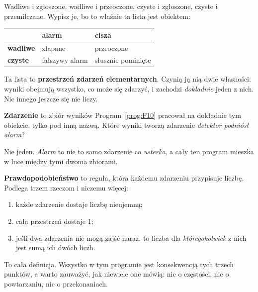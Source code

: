 \begin{fr}

Wadliwe i zgłoszone, wadliwe i przeoczone, czyste i zgłoszone, czyste i
przemilczane. Wypisz je, bo to właśnie ta lista jest obiektem:

\begin{center}
\begin{tabular}{lll}
\toprule
& \textbf{alarm} & \textbf{cisza} \\
\midrule
\textbf{wadliwe} & złapane & przeoczone \\
\textbf{czyste}  & fałszywy alarm & słusznie pominięte \\
\bottomrule
\end{tabular}
\end{center}

Ta lista to \textbf{przestrzeń zdarzeń
elementarnych}. Czynią ją nią dwie
własności: wyniki obejmują wszystko, co może się zdarzyć, i zachodzi
\emph{dokładnie} jeden z nich. Nic innego jeszcze się nie liczy.

\textbf{Zdarzenie} to zbiór wyników \dash{} Program~\ref{prog:F10} pracował na
dokładnie tym obiekcie, tylko pod inną nazwą. Które wyniki tworzą zdarzenie
\emph{detektor podniósł alarm}?
\dotline
\nextframe
\end{fr}

\begin{fr}

Nie jeden. \emph{Alarm} to nie to samo zdarzenie co \emph{usterka}, a cały ten
program mieszka w luce między tymi dwoma zbiorami.

\textbf{Prawdopodobieństwo} to reguła, która każdemu zdarzeniu przypisuje
liczbę. Podlega trzem rzeczom i niczemu więcej:

\begin{enumerate}
\item każde zdarzenie dostaje liczbę nieujemną;
\item cała przestrzeń dostaje $1$;
\item jeśli dwa zdarzenia nie mogą zajść naraz, to liczba dla
  \emph{któregokolwiek} z nich jest sumą ich dwóch liczb.
\end{enumerate}

To cała definicja. Wszystko w tym programie jest konsekwencją tych trzech
punktów, a warto zauważyć, jak niewiele one mówią: nic o częstości, nic o
powtarzaniu, nic o przekonaniach.

\end{fr}

